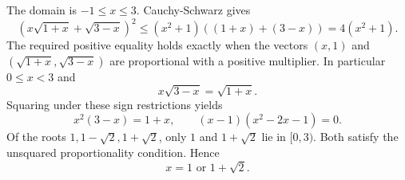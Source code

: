 The domain is $-1\le x\le3$. Cauchy-Schwarz gives
\[
\left(x\sqrt{1+x}+\sqrt{3-x}\right)^2
\le(x^2+1)((1+x)+(3-x))=4(x^2+1).
\]
The required positive equality holds exactly when the vectors $(x,1)$ and $(\sqrt{1+x},\sqrt{3-x})$ are proportional with a positive multiplier. In particular $0\le x<3$ and
\[
x\sqrt{3-x}=\sqrt{1+x}.
\]
Squaring under these sign restrictions yields
\[
x^2(3-x)=1+x,\qquad
(x-1)(x^2-2x-1)=0.
\]
Of the roots $1,1-\sqrt2,1+\sqrt2$, only $1$ and $1+\sqrt2$ lie in $[0,3)$. Both satisfy the unsquared proportionality condition. Hence
\[
\boxed{x=1\text{ or }1+\sqrt2}.
\]
